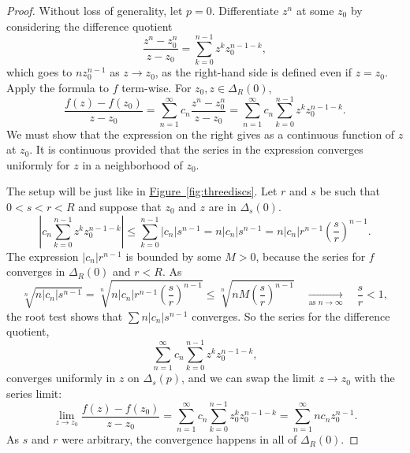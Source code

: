 \documentclass[12pt,openany]{book}
\newcommand{\sabs}[1]{\lvert {#1} \rvert}
\newcommand{\abs}[1]{\left\lvert {#1} \right\rvert}
\theoremstyle{plain}
\theoremstyle{remark}
\theoremstyle{definition}
\theoremstyle{exercise}
\theoremstyle{example}
\newcommand{\figureref}[1]{\hyperref[#1]{Figure~\ref*{#1}}}
\begin{document}
\begin{proof}
Without loss of generality, let $p=0$.
Differentiate $z^n$ at some $z_0$ by considering the difference
quotient
\begin{equation*}
\frac{z^n-z_0^n}{z-z_0}
=
\sum_{k=0}^{n-1}
z^k z_0^{n-1-k} ,
\end{equation*}
which goes to $n z_0^{n-1}$ as $z \to z_0$, as
the right-hand side is defined even if $z = z_0$.
Apply the formula to $f$
term-wise.  For $z_0,z \in \Delta_R(0)$,
\begin{equation*}
\frac{f(z) - f(z_0)}{z-z_0}
=
\sum_{n=1}^\infty c_n \frac{z^n-z_0^n}{z-z_0}
=
\sum_{n=1}^\infty c_n \sum_{k=0}^{n-1} z^k z_0^{n-1-k} .
\end{equation*}
We must show that the expression on the right gives as a continuous function of $z$
at $z_0$.
It is continuous provided that the series
in the expression converges uniformly for $z$ in a
neighborhood of $z_0$.

The setup will be just like in \figureref{fig:threediscs}.
Let $r$ and $s$ be such that $0 < s < r < R$ and suppose that $z_0$ and $z$ are
in $\Delta_s(0)$.
\begin{equation*}
\abs{c_n \sum_{k=0}^{n-1} z^k z_0^{n-1-k}}
\leq
\sum_{k=0}^{n-1} 
\sabs{c_n} s^{n-1}
=
n
\sabs{c_n} s^{n-1}
=
n
\sabs{c_n} r^{n-1} {\left(\frac{s}{r}\right)}^{n-1} .
\end{equation*}
The expression
$\sabs{c_n} r^{n-1}$ is bounded by some $M > 0$, because the series for $f$ converges
in $\Delta_R(0)$ and $r < R$.
As
\begin{equation*}
\sqrt[n]{
n \sabs{c_n} s^{n-1}
}
=
\sqrt[n]{
n \sabs{c_n} r^{n-1} {\left(\frac{s}{r}\right)}^{n-1}
}
\leq
\sqrt[n]{
n M {\left(\frac{s}{r}\right)}^{n-1}
}
\quad\underset{\text{as } n \to \infty}{\to}\quad
\frac{s}{r} < 1 ,
\end{equation*}
the root test shows that
$\sum n \sabs{c_n} s^{n-1}$
converges.
So the series for the difference quotient,
\begin{equation*}
\sum_{n=1}^\infty c_n \sum_{k=0}^{n-1} z^k z_0^{n-1-k} ,
\end{equation*}
converges uniformly in $z$ on $\Delta_s(p)$, and
we can swap the limit $z \to z_0$ with the series limit:
\begin{equation*}
\lim_{z \to z_0}
\frac{f(z)-f(z_0)}{z-z_0}
=
\sum_{n=1}^\infty c_n \sum_{k=0}^{n-1} z_0^k z_0^{n-1-k}
=
\sum_{n=1}^\infty n c_n z_0^{n-1} .
\end{equation*}
As $s$ and $r$ were arbitrary, the convergence happens in all of
$\Delta_R(0)$.
\end{proof}
\end{document}
